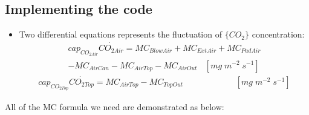 \documentclass[a4paper]{article}
\numberwithin{equation}{section}
\begin{document}
\subsection{Implementing the code} 
\begin{itemize}
  \item Two differential equations represents the fluctuation of $\{CO_2\}$ concentration:
        \begin{multline*}
          cap_{CO_{2Air}}\dot{CO_{2Air}} = MC_{BlowAir} + MC_{ExtAir} + MC_{PadAir} \\
          - MC_{AirCan} - MC_{AirTop} - MC_{AirOut} ~~~~ [mg\;m^{-2}\;s^{-1}]
        \end{multline*}
        \begin{multline*}
          cap_{CO_{2Top}}\dot{CO_{2Top}} = MC_{AirTop} - MC_{TopOut} ~~~~~~~~~~~~~~~~~~~~~~~~~~~~ [mg\;m^{-2}\;s^{-1}]
        \end{multline*}
\end{itemize}
All of the MC formula we need are demonstrated as below:\\
\end{document}
